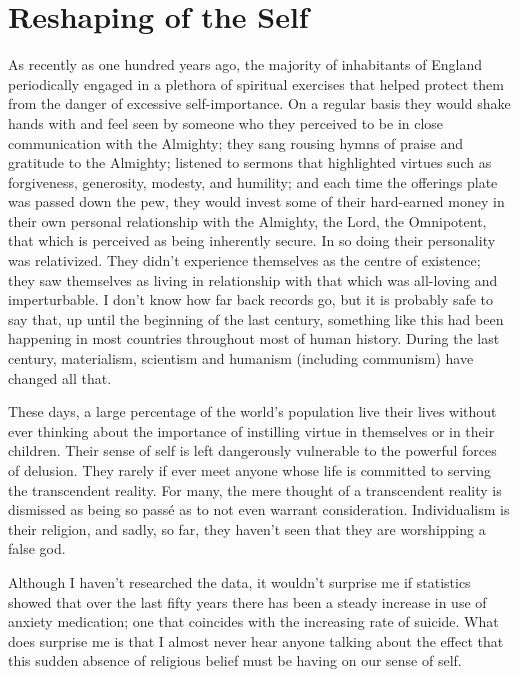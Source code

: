 \section{Reshaping of the Self}

As recently as one hundred years ago, the majority of inhabitants of
England periodically engaged in a plethora of spiritual exercises that
helped protect them from the danger of excessive self-importance. On a
regular basis they would shake hands with and feel seen by someone who
they perceived to be in close communication with the Almighty; they sang
rousing hymns of praise and gratitude to the Almighty; listened to
sermons that highlighted virtues such as forgiveness, generosity,
modesty, and humility; and each time the offerings plate was passed down
the pew, they would invest some of their hard-earned money in their own
personal relationship with the Almighty, the Lord, the Omnipotent, that
which is perceived as being inherently secure. In so doing their
personality was relativized. They didn't experience themselves as the
centre of existence; they saw themselves as living in relationship with
that which was all-loving and imperturbable. I don't know how far back
records go, but it is probably safe to say that, up until the beginning
of the last century, something like this had been happening in most
countries throughout most of human history. During the last century,
materialism, scientism and humanism (including communism) have changed
all that.

These days, a large percentage of the world's population live their
lives without ever thinking about the importance of instilling virtue in
themselves or in their children. Their sense of self is left dangerously
vulnerable to the powerful forces of delusion. They rarely if ever meet
anyone whose life is committed to serving the transcendent reality. For
many, the mere thought of a transcendent reality is dismissed as being
so passé as to not even warrant consideration. Individualism is their
religion, and sadly, so far, they haven't seen that they are worshipping
a false god.

Although I haven't researched the data, it wouldn't surprise me if
statistics showed that over the last fifty years there has been a steady
increase in use of anxiety medication; one that coincides with the
increasing rate of suicide\cite{suicide}.
What does surprise me is that I almost never hear anyone
talking about the effect that this sudden absence of religious belief
must be having on our sense of self.

